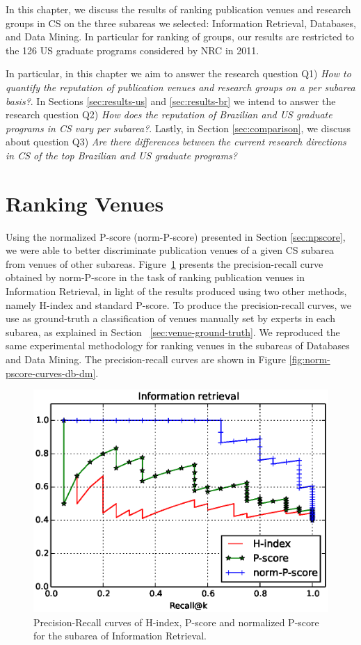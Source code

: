 \documentclass[msc]{ppgccufmg}
\begin{document}
In this chapter, we discuss the results of ranking publication venues and research groups in CS on the three subareas we selected: Information Retrieval, Databases, and Data Mining. In particular for ranking of groups, our results are restricted to the 126 US graduate programs considered by NRC in 2011.

In particular, in this chapter we aim to answer the research question Q1) \textit{How to quantify the reputation of publication venues and research groups on a per subarea basis?}. In Sections \ref{sec:results-us} and \ref{sec:results-br} we intend to answer the research question Q2) \textit{How does the reputation of Brazilian and US graduate programs in CS vary per subarea?}. Lastly, in Section \ref{sec:comparison}, we discuss about question Q3) \textit{Are there differences between the current research directions in CS of the top Brazilian and US graduate programs?}

\section{Ranking Venues}\label{sec:results-venues}

Using the normalized P-score (norm-P-score) presented in Section \ref{sec:npscore}, we were able to better discriminate publication venues of a given CS subarea from venues of other subareas. Figure~\ref{fig:norm-pscore-curves-ir} presents the precision-recall curve obtained by norm-P-score in the task of ranking publication venues in Information Retrieval, in light of the results produced using two other methods, namely H-index and standard P-score. %
To produce the precision-recall curves, we use as ground-truth a classification of venues manually set by experts in each subarea, as explained in Section ~\ref{sec:venue-ground-truth}. 
We reproduced the same experimental methodology for ranking venues in the subareas of Databases and Data Mining. The precision-recall curves are shown in Figure \ref{fig:norm-pscore-curves-db-dm}.

\begin{figure}[htbp]
	\centering
    \label{fig:norm-pscore-curves-ir}
    \includegraphics[width=0.8\linewidth]{fig/ir-prec-recall.eps}
    \caption{Precision-Recall curves of H-index, P-score and normalized P-score for the subarea of Information Retrieval.}
\end{figure}
\end{document}

